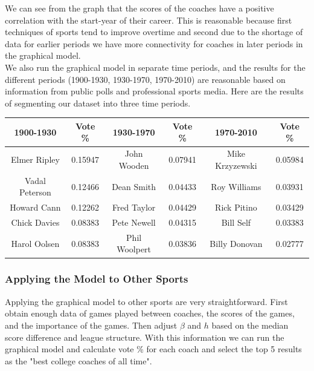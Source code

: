 \documentclass[11pt,notitlepage]{article}
\begin{document}
\noindent We can see from the graph that the scores of the coaches have a positive correlation with the start-year of their career. This is reasonable because first techniques of sports tend to improve overtime and second due to the shortage of data for earlier periods we have more connectivity for coaches in later periods in the graphical model.
\\

\noindent We also run the graphical model in separate time periods, and the results for the different periods (1900-1930, 1930-1970, 1970-2010) are reasonable based on information from public polls and professional sports media. Here are the results of segmenting our dataset into three time periods.

\begin{center}

\begin{tabular}{ | c | c | c| c | c| c| }

\hline

1900-1930  & Vote \% & 1930-1970  & Vote \% & 1970-2010  & Vote \% \\\hline

Elmer Ripley & 0.15947 & John Wooden & 0.07941 & Mike Krzyzewski & 0.05984 \\\hline

Vadal Peterson & 0.12466 & Dean Smith & 0.04433 & Roy Williams & 0.03931\\\hline

Howard Cann  &0.12262 & Fred Taylor & 0.04429 & Rick Pitino & 0.03429\\\hline

Chick Davies & 0.08383 & Pete Newell & 0.04315 & Bill Self & 0.03383 \\\hline

Harol Oolsen & 0.08383 & Phil Woolpert & 0.03836 & Billy Donovan & 0.02777\\

\hline

\end{tabular}

\end{center}

\subsubsection*{Applying the Model to Other Sports}

Applying the graphical model to other sports are very straightforward. First obtain enough data of games played between coaches, the scores of the games, and the importance of the games. Then adjust $\beta$ and $h$ based on the median score difference and league structure. With this information we can run the graphical model and calculate vote \% for each coach and select the top 5 results as the "best college coaches of all time".
\end{document}

